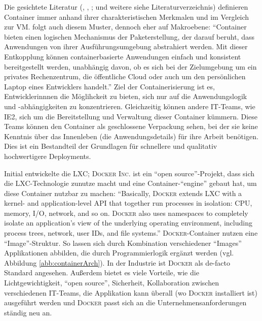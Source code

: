 Die gesichtete Literatur (\cite{pahl_containerization_2015}, \cite{bernstein_containers_2014}, \cite{kharb_automated_2016}; \cite{combe_docker_2016} und weitere siehe Literaturverzeichnis) definieren Container immer anhand ihrer charakteristischen Merkmalen und im Vergleich zur \ac{VM}. \cite{google_ireland_limited_container_2020} folgt auch diesem Muster, dennoch eher auf Makroebene: \enquote{Container bieten einen logischen Mechanismus der Paketerstellung, der darauf beruht, dass Anwendungen von ihrer Ausführungsumgebung abstrahiert werden. Mit dieser Entkopplung können containerbasierte Anwendungen einfach und konsistent bereitgestellt werden, unabhängig davon, ob es sich bei der Zielumgebung um ein privates Rechenzentrum, die öffentliche Cloud oder auch um den persönlichen Laptop eines Entwicklers handelt.}\autocite[][]{google_ireland_limited_container_2020} Ziel der Containerisierung ist es, Entwicklerinnnen die Möglihckeit zu bieten, sich nur auf die Anwendungslogik und -abhängigkeiten zu konzentrieren. Gleichzeitig können andere IT-Teams, wie \ac{IE2}, sich um die Bereitstellung und Verwaltung dieser Container kümmern. Diese Teams können den Container als geschlossene Verpackung sehen, bei der sie keine Kenntnis über das Innenleben (die Anwendungsdetails) für ihre Arbeit benötigen.\autocite[vgl.][]{google_ireland_limited_container_2020} Dies ist ein Bestandteil der Grundlagen für schnellere und qualitativ hochwertigere Deployments.\autocite[vgl.][S.1]{kharb_automated_2016} \par
Initial entwickelte \cite{canonical_ltd_linux_2020} die \ac{LXC}; \textsc{Docker Inc.} ist ein \enquote{open source}-Projekt, dass sich die \ac{LXC}-Technologie zunutze macht und eine Container-\enquote{engine} gebaut hat, um diese Container nutzbar zu machen: \enquote{Basically, \textsc{Docker} extends LXC with a kernel- and application-level API that together run processes in isolation: CPU, memory, I/O, network, and so on. \textsc{Docker} also uses namespaces to completely isolate an application’s view of the underlying operating environment, including process trees, network, user IDs, and file systems.}\autocite[][S.82]{bernstein_containers_2014} \textsc{Docker}-Container nutzen eine \enquote{Image}-Struktur. So lassen sich durch Kombination verschiedener \enquote{Images} Applikationen abbilden, die durch Programmierlogik ergänzt werden (vgl. Abbildung \vref{abb:containerArch}). In der Industrie ist \textsc{Docker} als de-facto Standard\autocite[vgl.][S.30]{pahl_containerization_2015} angesehen\autocite[vgl.][S.1]{kharb_automated_2016}. Außerdem bietet es viele Vorteile, wie die Lichtgewichtigkeit, \enquote{open source}, Sicherheit, Kollaboration zwischen verschiedenen IT-Teams, die Applikation kann überall (wo \textsc{Docker} installiert ist) ausgeführt werden und \textsc{Docker} passt sich an die Unternehmensanforderungen ständig neu an.\autocite[vgl.][S.1]{kharb_automated_2016} 

